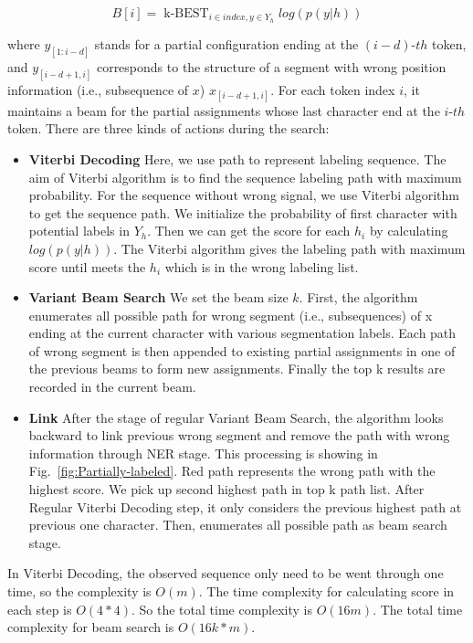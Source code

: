 \documentclass[conference]{IEEEtran}
\begin{document}
\begin{equation}
B[i]=\mathop{k\text{-}BEST}_{i \in index, y \in Y_h} log(p(y|h)) \label{eq}
\end{equation}

where $y_{[1:i−d]}$ stands for a partial configuration ending at the $(i-d)$-$th$ token, and $y_{[i−d+1,i]}$ corresponds to the structure of a segment with wrong position information (i.e., subsequence of $x$) $x_{[i−d+1,i]}$. For each token index $i$, it maintains a beam for the partial assignments whose last character end at the $i$-$th$ token. There are three kinds of actions during the search:

\begin{itemize} 
\item \textbf{Viterbi Decoding}
Here, we use path to represent labeling sequence. The aim of Viterbi algorithm is to find the sequence labeling path with maximum probability. For the sequence without wrong signal, we use Viterbi algorithm to get the sequence path. We initialize the probability of first character with potential labels in $Y_h$. Then we can get the score for each $h_i$ by calculating $log(p(y|h))$. The Viterbi algorithm gives the labeling path with maximum  score until meets the $h_i$ which is in the wrong labeling list.
  
\item \textbf{Variant Beam Search}
We set the beam size $k$. First, the algorithm enumerates all possible path for wrong segment  (i.e., subsequences) of x ending at the current character with various segmentation labels. Each path of wrong segment is then appended to existing partial assignments in one of the previous beams to form new assignments. Finally the top k results are recorded in the current beam.

\item  \textbf{Link} After the stage of regular Variant Beam Search, the algorithm looks backward to link previous wrong segment and remove the path with wrong information through NER stage. This processing is showing in Fig.~\ref{fig:Partially-labeled}. Red path represents the wrong path with the highest score. We pick up second highest path in top k path list.  After Regular Viterbi Decoding step, it only considers the previous highest path at previous one character. Then, enumerates all possible path as beam search stage.
\end{itemize}

In Viterbi Decoding, the observed sequence only need to be went through one time, so the complexity is $O(m)$. The time complexity for calculating score in each step is $O(4*4)$. So the total time complexity is $O(16m)$. The total time complexity for beam search is $O(16k*m)$.
\end{document}
